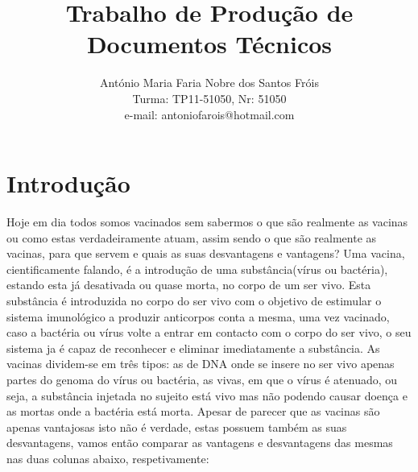 \documentclass[10pt,a4paper,titlepage]{report}
\begin{document}
\author{António Maria Faria Nobre dos Santos Fróis\\Turma: TP11-51050, Nr: 51050\\e-mail: antoniofarois@hotmail.com}
\title{Trabalho de Produção de Documentos Técnicos}
\thispagestyle{empty}
\maketitle
\tableofcontents
\chapter{Introdução}
	Hoje em dia todos somos vacinados sem sabermos o que são realmente as vacinas ou como estas verdadeiramente atuam, assim sendo o que são realmente as vacinas, para que servem e quais as suas desvantagens e vantagens? Uma vacina, cientificamente falando, é a introdução de uma substância(vírus ou bactéria), estando esta já desativada ou quase morta, no corpo de um ser vivo. Esta substância é introduzida no corpo do ser vivo com o objetivo de estimular o sistema imunológico a produzir anticorpos conta a mesma, uma vez vacinado, caso a bactéria ou vírus volte a entrar em contacto com o corpo do ser vivo, o seu sistema ja é capaz de reconhecer e eliminar imediatamente a substância. As vacinas dividem-se em três tipos: as de DNA onde se insere no ser vivo apenas partes do genoma do vírus ou bactéria, as vivas, em que o vírus é atenuado, ou seja, a substância injetada no sujeito está vivo mas não podendo causar doença e as mortas onde a bactéria está morta. Apesar de parecer que as vacinas são apenas vantajosas isto não é verdade, estas possuem também as suas desvantagens, vamos então comparar as vantagens e desvantagens das mesmas nas duas colunas abaixo, respetivamente:
\vspace{1cm}
\end{document}
